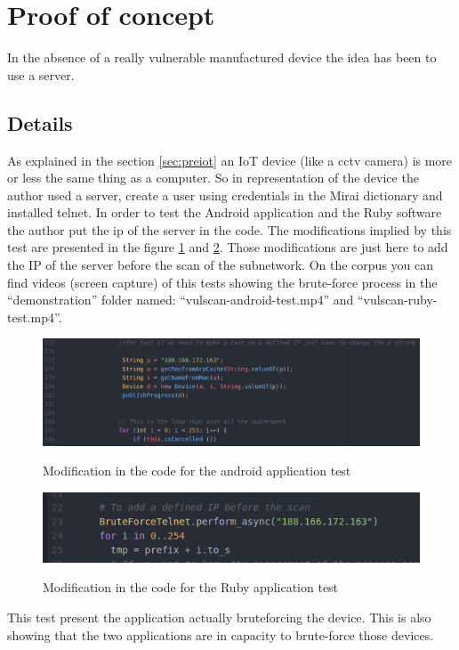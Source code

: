\documentclass{report}
\begin{document}
\section{Proof of concept}
In the absence of a really vulnerable manufactured device the idea has been to use a server.

\subsection{Details}
As explained in the section \ref{sec:preiot} an IoT device (like a cctv camera) is more or less the same thing as a computer. So in representation of the device the author used a server, create a user using credentials in the Mirai dictionary and installed telnet. In order to test the Android application and the Ruby software the author put the ip of the server in the code. The modifications implied by this test are presented in the figure \ref{fig:mod-and} and \ref{fig:mod-ruby}. Those modifications are just here to add the IP of the server before the scan of the subnetwork. On the corpus you can find videos (screen capture) of this tests showing the brute-force process in the ``demonstration'' folder named: ``vulscan-android-test.mp4'' and ``vulscan-ruby-test.mp4''.
\begin{figure}[h]
 \caption{Modification in the code for the android application test}
 \centering
 \includegraphics[width=1.2\textwidth]{./img/exp/vulscan-android-test-modification}
 \label{fig:mod-and}
\end{figure}
\begin{figure}[h]
 \caption{Modification in the code for the Ruby application test}
 \centering
 \includegraphics[width=1.2\textwidth]{./img/exp/vulscan-ruby-test-modification}
 \label{fig:mod-ruby}
\end{figure}
This test present the application actually bruteforcing the device. This is also showing that the two applications are in capacity to brute-force those devices.
\end{document}
